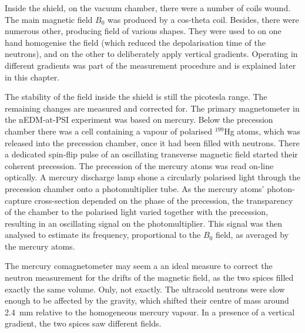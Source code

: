 Inside the shield, on the vacuum chamber, there were a number of coils wound. The main magnetic field $B_0$ was produced by a cos-theta coil. Besides, there were numerous other, producing field of various shapes.
They were used to on one hand homogenise the field (which reduced the depolarisation time of the neutrons),
and on the other to deliberately apply vertical gradients. Operating in different gradients was part of the measurement procedure and is explained later in this chapter.

The stability of the field inside the shield is still the picotesla range. The remaining changes are measured and corrected for. The primary magnetometer in the nEDM-at-PSI experiment was based on mercury. Below the precession chamber there was a cell containing a vapour of polarised $^{199}$Hg atoms, which was released into the precession chamber, once it had been filled with neutrons.
There a dedicated spin-flip pulse of an oscillating transverse magnetic field started their coherent precession. The precession of the mercury atoms was read on-line optically. A mercury discharge lamp shone a circularly polarised light through the precession chamber onto a photomultiplier tube. As the mercury atoms' photon-capture cross-section depended on the phase of the precession, the transparency of the chamber to the polarised light varied together with the precession, resulting in an oscillating signal on the photomultiplier. This signal was then analysed to estimate its frequency, proportional to the $B_0$ field, as averaged by the mercury atoms.

The mercury comagnetometer may seem a an ideal measure to correct the neutron measurement for the drifts of the magnetic field, as the two spices filled exactly the same volume. Only, not exactly. The ultracold neutrons were slow enough to be affected by the gravity, which shifted their centre of mass around \SI{2.4}{\milli\meter} relative to the homogeneous mercury vapour. In a presence of a vertical gradient, the two spices saw different fields.

